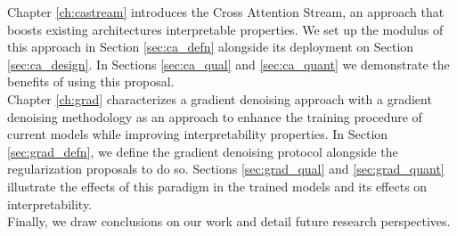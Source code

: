 \noindent Chapter \ref{ch:castream} introduces the Cross Attention Stream, an approach that boosts 
existing architectures interpretable properties. We set up the modulus of this approach in 
Section \ref{sec:ca_defn} alongside its deployment on Section \ref{sec:ca_design}. 
In Sections \ref{sec:ca_qual} and \ref{sec:ca_quant} we demonstrate the benefits of using this
proposal.\\

\noindent Chapter \ref{ch:grad} characterizes a gradient denoising approach with a gradient denoising 
methodology as an approach to enhance the training procedure of current models while improving 
interpretability properties. In Section \ref{sec:grad_defn}, we define the gradient denoising 
protocol alongside the regularization proposals to do so.
Sections \ref{sec:grad_qual} and \ref{sec:grad_quant} illustrate the effects of this paradigm
in the trained models and its effects on interpretability.\\
    
\noindent Finally, we draw conclusions on our work and detail future research perspectives.

